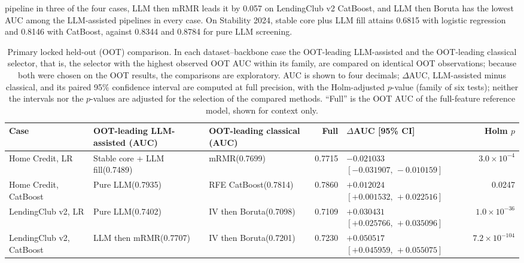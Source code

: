 \documentclass[final,5p,twocolumn]{elsarticle}
\begin{document}
pipeline in three of the four cases, LLM then mRMR leads it by 0.057 on LendingClub v2 CatBoost, and LLM then Boruta has the lowest AUC among the LLM-assisted pipelines in every case. On Stability 2024, stable core plus LLM fill attains 0.6815 with logistic regression and 0.8146 with CatBoost, against 0.8344 and 0.8784 for pure LLM screening.

\begin{table}[htbp]
\centering
\scriptsize
\setlength{\tabcolsep}{3pt}
\begin{threeparttable}
\caption{Primary locked held-out (OOT) comparison. In each dataset--backbone case the OOT-leading LLM-assisted and the OOT-leading classical selector, that is, the selector with the highest observed OOT AUC within its family, are compared on identical OOT observations; because both were chosen on the OOT results, the comparisons are exploratory. AUC is shown to four decimals; $\Delta$AUC, LLM-assisted minus classical, and its paired 95\% confidence interval are computed at full precision, with the Holm-adjusted $p$-value (family of six tests); neither the intervals nor the $p$-values are adjusted for the selection of the compared methods. ``Full'' is the OOT AUC of the full-feature reference model, shown for context only.}
\label{tab:primary_results}
\begin{tabular}{@{}L{21mm}L{25mm}L{22mm}rL{36mm}r@{}}
\toprule
Case & OOT-leading LLM-assisted (AUC) & OOT-leading classical (AUC) & Full & $\Delta$AUC [95\% CI] & Holm $p$ \\
\midrule
Home Credit, LR & Stable core + LLM fill\newline (0.7489) & mRMR\newline (0.7699) & 0.7715 & $-0.021033$\newline $[-0.031907,\,-0.010159]$ & $3.0\times10^{-4}$ \\
\addlinespace
Home Credit, CatBoost & Pure LLM\newline (0.7935) & RFE CatBoost\newline (0.7814) & 0.7860 & $+0.012024$\newline $[+0.001532,\,+0.022516]$ & 0.0247 \\
\addlinespace
LendingClub v2, LR & Pure LLM\newline (0.7402) & IV then Boruta\newline (0.7098) & 0.7109 & $+0.030431$\newline $[+0.025766,\,+0.035096]$ & $1.0\times10^{-36}$ \\
\addlinespace
LendingClub v2, CatBoost & LLM then mRMR\newline (0.7707) & IV then Boruta\newline (0.7201) & 0.7230 & $+0.050517$\newline $[+0.045959,\,+0.055075]$ & $7.2\times10^{-104}$ \\

\end{tabular}
\end{threeparttable}
\end{table}
\end{document}
